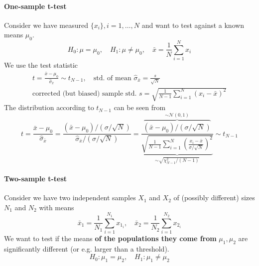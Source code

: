 \paragraph*{One-sample t-test} Consider we have measured $\{ x_i \}, i=1,\ldots,N$ and want to test against a known means $\mu_0$.
\begin{equation}
    H_0: \mu = \mu_0, \quad H_1: \mu \neq \mu_0, \quad \bar{x} = \frac{1}{N} \sum_{i=1}^N x_i
\end{equation}
We use the test statistic
\begin{equation}
    \begin{gathered}
        t = \frac{\bar{x} - \mu_0}{\hat{\sigma}_{\bar{x}}} \sim t_{N-1}, \quad \text{std. of mean } \hat{\sigma}_{\bar{x}} = \frac{s}{\sqrt{N}} \\
        \text{corrected (but biased) sample std. } s = \sqrt{\frac{1}{N-1} \sum_{i=1}^N (x_i - \bar{x})^2}
    \end{gathered}
\end{equation}
The distribution according to $t_{N-1}$ can be seen from
\begin{equation}
    t=\frac{\bar{x}-\mu_0}{\hat{\sigma}_{\bar{x}}}=\frac{\left(\bar{x}-\mu_0\right) /(\sigma / \sqrt{N})}{\hat{\sigma}_{\bar{x}} /(\sigma / \sqrt{N})}=\frac{\overbrace{\left(\bar{x}-\mu_0\right) /(\sigma / \sqrt{N})}^{\sim \mathcal{N}(0,1)}}{\underbrace{\sqrt{\frac{1}{N-1} \sum_{i=1}^N\left(\frac{x_i-\bar{x}}{\sigma \slash \sqrt{N}}\right)^2}}_{\sim \sqrt{\chi_{N-1}^2 \slash (N-1)}}} \sim t_{N-1}
\end{equation}

\paragraph*{Two-sample t-test} Consider we have two independent samples $X_1$ and $X_2$ of (possibly different) sizes $N_1$ and $N_2$ with means
\begin{equation}
    \bar{x}_1 = \frac{1}{N_1} \sum_{i=1}^{N_1} x_{1_i}, \quad \bar{x}_2 = \frac{1}{N_2} \sum_{i=1}^{N_2} x_{2_i}
\end{equation}
We want to test if the means \textbf{of the populations they come from} $\mu_1, \mu_2$ are significantly different (or e.g. larger than a threshold).
\begin{equation}
    H_0: \mu_1 = \mu_2, \quad H_1: \mu_1 \neq \mu_2
\end{equation}

